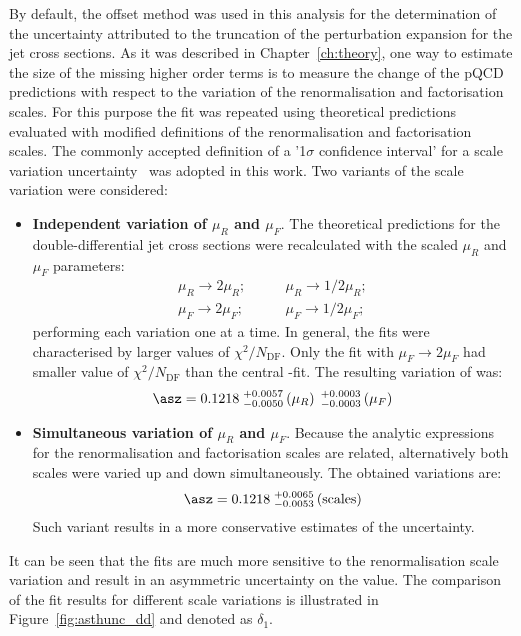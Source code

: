By default, the offset method was used in this analysis for the determination of the uncertainty attributed to the truncation of the perturbation expansion for the jet cross sections. As it was described in Chapter~\ref{ch:theory}, one way to estimate 
the size of the missing higher order terms is to measure the change of the pQCD predictions with respect to the variation of the renormalisation and factorisation scales. For this purpose the \asz fit was repeated using theoretical predictions evaluated with modified definitions of the renormalisation and factorisation scales. The commonly accepted definition of a '1$\sigma$ confidence interval' for a scale variation uncertainty~\cite{soper:1997} was adopted in this work. Two variants of the scale variation were considered:
\begin{itemize}
 \item \textbf{Independent variation of $\mu_R$ and $\mu_F$}. The theoretical predictions for the double-differential jet cross sections were recalculated with the scaled $\mu_R$ and $\mu_F$ parameters:
\begin{align}
 \mu_R \rightarrow 2\mu_R;&\qquad \mu_R \rightarrow 1/2\mu_R;\\
 \mu_F \rightarrow 2\mu_F;&\qquad \mu_F \rightarrow 1/2\mu_F;
\end{align}
performing each variation one at a time. In general, the fits were characterised by larger values of $\chi^2/N_\text{DF}$. Only the fit with $\mu_F \rightarrow 2\mu_F$ had smaller value of $\chi^2/N_\text{DF}$ than the central \asz-fit. The resulting variation of \asz was:
\begin{equation}
 \asz = 0.1218\;^{+0.0057}_{-0.0050}\left(\mu_R\right)\;^{+0.0003}_{-0.0003}\left(\mu_F\right)
\end{equation}
\item \textbf{Simultaneous variation of $\mu_R$ and $\mu_F$}. Because the analytic expressions for the renormalisation and factorisation scales are related, alternatively both scales were varied up and down simultaneously. The obtained variations are:
\begin{equation}
 \asz = 0.1218\;^{+0.0065}_{-0.0053}\left(\text{scales}\right)
\end{equation}
Such variant results in a more conservative estimates of the uncertainty. 
\end{itemize}
It can be seen that the fits are much more sensitive to the renormalisation scale variation and result in an asymmetric uncertainty on the \asz value. The comparison of the fit results for different scale variations is illustrated in Figure~\ref{fig:asthunc_dd} and denoted as $\delta_1$.

